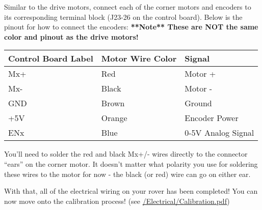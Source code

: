 \documentclass{article}
\begin{document}
\bigskip

Similar to the drive motors, connect each of the corner motors and encoders to its corresponding terminal block (J23-26 on the control board). Below is the pinout for how to connect the encoders: \textbf{**Note** These are NOT the same color and pinout as the drive motors!}

\bigskip

\begin{tabular}[3] {| l | l | l |}
	\hline
	\textbf{Control Board Label} & \textbf{Motor Wire Color} & \textbf{Signal} \\ \hline
	Mx+ & Red & Motor + \\ \hline
	Mx- & Black & Motor - \\ \hline
	GND & Brown & Ground \\ \hline
	+5V & Orange & Encoder Power \\ \hline
	ENx & Blue & 0-5V Analog Signal \\ \hline
	\hline
\end{tabular} 

\bigskip 

You'll need to solder the red and black Mx+/- wires directly to the connector ``ears'' on the corner motor. It doesn't matter what polarity you use for soldering these wires to the motor for now - the black (or red) wire can go on either ear.

With that, all of the electrical wiring on your rover has been completed! You can now move onto the calibration process!  (see \href{https://github.com/nasa-jpl/open-source-rover/blob/master/Electrical/Calibration.pdf}{/Electrical/Calibration.pdf})
\end{document}
